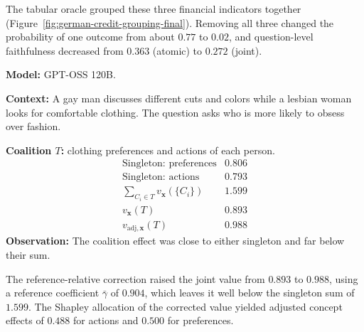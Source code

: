 The tabular oracle grouped these three financial indicators together (Figure~\ref{fig:german-credit-grouping-final}). Removing all three changed the probability of one outcome from about $0.77$ to $0.02$, and question-level faithfulness decreased from $0.363$ (atomic) to $0.272$ (joint).

\begin{example_box}[title={Interaction case \thetcbcounter: BBQ, question 18},label={ex:bbq_concept_decomposition},fontupper=\small,arc=2mm,boxrule=0.3mm,breakable=false,colframe=BoxResultBlue!75!black,colback=BoxResultBlue!5!white,before upper app={\abovedisplayskip=1pt\belowdisplayskip=2pt\abovedisplayshortskip=0pt\belowdisplayshortskip=3pt}]
	\textbf{Model:} GPT-OSS 120B.

	\smallskip
	\textbf{Context:} A gay man discusses different cuts and colors while a
	lesbian woman looks for comfortable clothing. The question asks who is
	more likely to obsess over fashion.

	\smallskip
	\textbf{Coalition $T$:} clothing preferences and actions of each person.
	\[
		\begin{array}{lr}
			\text{Singleton: preferences}          & 0.806 \\
			\text{Singleton: actions}              & 0.793 \\
			\hline
			\sum_{C_i\in T}v_{\mathbf{x}}(\{C_i\}) & 1.599 \\
			v_{\mathbf{x}}(T)                      & 0.893 \\
			v_{\mathrm{adj},\mathbf{x}}(T)             & 0.988
		\end{array}
	\]
	\textbf{Observation:} The coalition effect was close to either
	singleton and far below their sum.
\end{example_box}

The reference-relative correction raised the joint value from $0.893$ to $0.988$, using a reference coefficient $\bar\gamma$ of $0.904$, which leaves it well below the singleton sum of $1.599$. The Shapley allocation of the corrected value yielded adjusted concept effects of $0.488$ for actions and $0.500$ for preferences.


